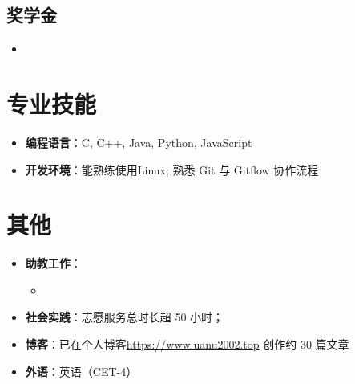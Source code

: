 \documentclass{resume}
\begin{document}
\subsection{\textbf{奖学金}}
\begin{itemize}
  \item {}
\end{itemize}

\section{专业技能}
\begin{itemize}
  \item \textbf{编程语言}：C, C++, Java, Python, JavaScript
  \item \textbf{开发环境}：能熟练使用Linux; 熟悉 Git 与 Gitflow 协作流程
\end{itemize}

\section{其他}
\begin{itemize}
  \item \textbf{助教工作}：
        \begin{itemize}
          \item {}
        \end{itemize}
  \item \textbf{社会实践}：志愿服务总时长超 50 小时；
  \item \textbf{博客}：已在个人博客\url{https://www.uanu2002.top} 创作约 30 篇文章
  \item \textbf{外语}：英语（CET-4）
\end{itemize}
\end{document}
